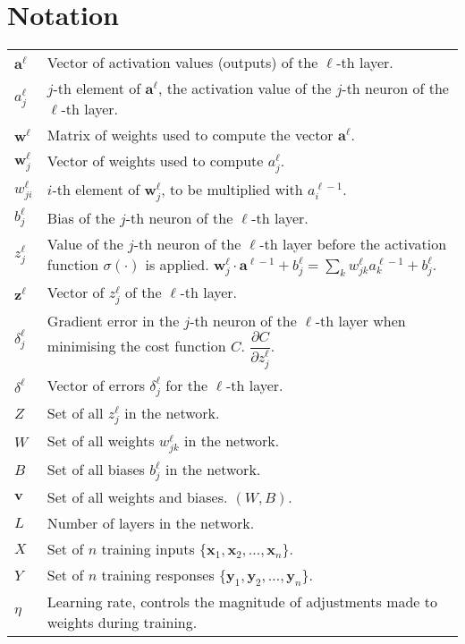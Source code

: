 \section*{Notation}

\begin{tabular}{p{1cm}p{13cm}}
$\mathbf{a}^\ell$ & Vector of activation values (outputs) of the $\ell$-th layer.\\
$a_j^\ell$ & $j$-th element of $\mathbf{a}^\ell$, the activation value of the $j$-th neuron of the $\ell$-th layer.\\
$\mathbf{w}^\ell$ & Matrix of weights used to compute the vector $\mathbf{a}^\ell$.\\
$\mathbf{w}^\ell_j$ & Vector of weights used to compute $a_j^\ell$.\\
$w_{ji}^\ell$ & $i$-th element of $\mathbf{w}^\ell_j$, to be multiplied with $a_i^{\ell-1}$.\\
$b_j^\ell$ & Bias of the $j$-th neuron of the $\ell$-th layer.\\
$z_j^\ell$ & Value of the $j$-th neuron of the $\ell$-th layer before the activation function $\sigma(\cdot)$ is applied. $\mathbf{w}_j^\ell\cdot \mathbf{a}^{\ell-1} + b_j^\ell= \sum_k w_{jk}^\ell a_k^{\ell-1} + b_j^\ell$.\\
$\mathbf{z}^\ell$ & Vector of $z_j^\ell$ of the $\ell$-th layer.\\
$\delta_j^\ell$ & Gradient error in the $j$-th neuron of the $\ell$-th layer when minimising the cost function $C$. $\dfrac{\partial C}{\partial z_j^\ell}$.\\
$\delta^\ell$ & Vector of errors $\delta_j^\ell$ for the $\ell$-th layer.\\
$Z$ & Set of all $z_j^\ell$ in the network. \\
$W$ & Set of all weights $w_{jk}^\ell$ in the network.\\
$B$ & Set of all biases $b_j^\ell$ in the network. \\
$\mathbf{v}$ & Set of all weights and biases. $(W,B)$.\\
$L$ & Number of layers in the network.\\
$X$ & Set of $n$ training inputs $\{\mathbf{x}_1, \mathbf{x}_2, \ldots, \mathbf{x}_n\}$. \\
$Y$ & Set of $n$ training responses $\{\mathbf{y}_1, \mathbf{y}_2, \ldots, \mathbf{y}_n\}$.\\
$\eta$ & Learning rate, controls the magnitude of adjustments made to weights during training.
\end{tabular}